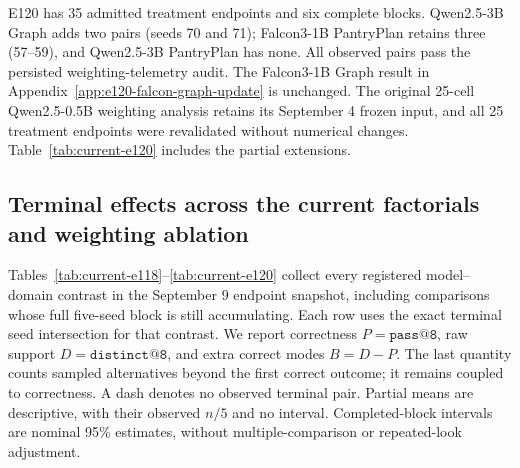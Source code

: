 \documentclass{article}
\newcommand{\1}{\mathbf 1}
\theoremstyle{remark}
\theoremstyle{definition}
\theoremstyle{plain}
\begin{document}
\begin{table}[H]
  \centering
  \caption{\textbf{Completed Level-2 Countdown, Python, and MathIR replay effects.}
  Each contrast uses all five registered seeds, 43--47, at pass 8.
  ReplayMaxRL is compared with MaxRL; ReplayDr.GRPO with Dr.GRPO.
  Entries give the paired mean and unadjusted 95\% Student-$t$ interval.
  Extra modes are \texttt{distinct@8}$-$\texttt{pass@8}; their effect remains
  coupled to correctness.}
  \label{tab:latest-completed-effects}
  \scriptsize
  \setlength{\tabcolsep}{3pt}
\end{table}

E120 has 35 admitted treatment endpoints and six complete blocks.
Qwen2.5-3B Graph adds two pairs (seeds 70 and 71); Falcon3-1B PantryPlan
retains three (57--59), and Qwen2.5-3B PantryPlan has none. All observed
pairs pass the persisted weighting-telemetry audit. The Falcon3-1B Graph
result in Appendix~\ref{app:e120-falcon-graph-update} is unchanged.
The original 25-cell Qwen2.5-0.5B weighting analysis retains its September 4
frozen input, and all 25 treatment endpoints were revalidated without
numerical changes. Table~\ref{tab:current-e120} includes the partial extensions.


\subsection{Terminal effects across the current factorials and weighting ablation}
\label{app:current-campaign-results}

Tables~\ref{tab:current-e118}--\ref{tab:current-e120} collect every registered
model--domain contrast in the September 9 endpoint snapshot, including
comparisons whose full five-seed block is still accumulating. Each row uses
the exact terminal seed intersection for that contrast. We report correctness
$P=\texttt{pass@8}$, raw support $D=\texttt{distinct@8}$, and extra correct
modes $B=D-P$. The last quantity counts sampled alternatives beyond the first
correct outcome; it remains coupled to correctness. A dash denotes no observed
terminal pair. Partial means are descriptive, with their observed $n/5$ and
no interval. Completed-block intervals are nominal 95\% estimates, without
multiple-comparison or repeated-look adjustment.
\end{document}
